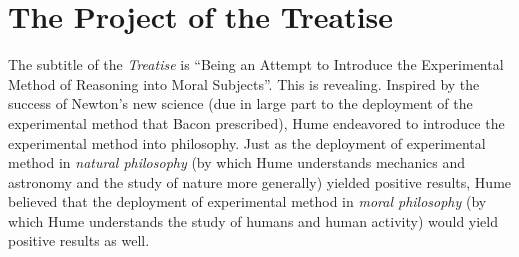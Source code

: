% 



\section{The Project of the Treatise}\label{sec:the_project_of_the_emph_treatise_} %

The subtitle of the \emph{Treatise} is ``Being an Attempt to Introduce the Experimental Method of Reasoning into Moral Subjects''. This is revealing. Inspired by the success of Newton’s new science (due in large part to the deployment of the experimental method that Bacon prescribed), Hume endeavored to introduce the experimental method into philosophy. Just as the deployment of experimental method in \emph{natural philosophy} (by which Hume understands mechanics and astronomy and the study of nature more generally) yielded positive results, Hume believed that the deployment of experimental method in \emph{moral philosophy} (by which Hume understands the study of humans and human activity) would yield positive results as well.

